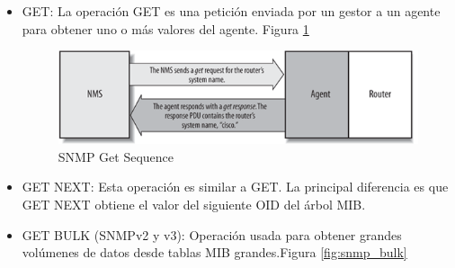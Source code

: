 \begin{itemize}
    \item GET: La operación GET es una petición enviada por un gestor a un agente para obtener uno o
    más valores del agente. Figura \ref{fig:snmp_get}
    \begin{figure}[H]
        \centering
        \includegraphics[width=.5\linewidth]{graphics/snmp_get}
        \caption{SNMP Get Sequence}
        \label{fig:snmp_get}
    \end{figure}
    
    \item GET NEXT: Esta operación es similar a GET. La principal diferencia es que GET NEXT obtiene
    el valor del siguiente OID del árbol MIB.
    \item GET BULK (SNMPv2 y v3): Operación usada para obtener grandes volúmenes de datos desde tablas
    MIB grandes.Figura \ref{fig:snmp_bulk}
    

\end{itemize}
